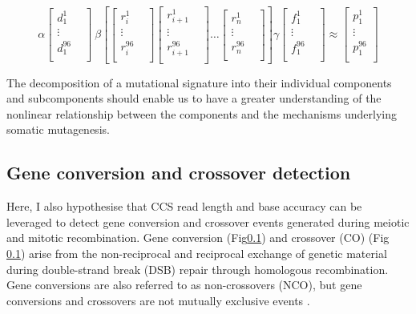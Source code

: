 \begin{equation} \label{eq:4}
\alpha \begin{bmatrix}
    d^{1}_{1}  \\
    \vdots &  \\
    d^{96}_{1}  \\
\end{bmatrix} \
\beta \left[\begin{bmatrix}
    r^{1}_{i} \\
    \vdots &  \\
    r^{96}_{i} \\
\end{bmatrix} 
\begin{bmatrix}
    r^{1}_{i+1} \\
    \vdots &  \\
    r^{96}_{i+1} \\
\end{bmatrix} \ldots 
\begin{bmatrix}
    r^{1}_{n} \\
    \vdots &  \\
    r^{96}_{n} \\
\end{bmatrix}\right]
\gamma \begin{bmatrix}
    f^{1}_{1}  \\
    \vdots &  \\
    f^{96}_{1}  \\
\end{bmatrix} \approx
\begin{bmatrix}
    p^{1}_{1} \\
    \vdots \\
    p^{96}_{1} \\
\end{bmatrix}
\end{equation}

The decomposition of a mutational signature into their individual components and subcomponents should enable us to have a greater understanding of the nonlinear relationship between the components and the mechanisms underlying somatic mutagenesis.



\subsection{Gene conversion and crossover detection}

Here, I also hypothesise that CCS read length and base accuracy can be leveraged to detect gene conversion and crossover events generated during meiotic and mitotic recombination. Gene conversion (Fig\ref{}) and crossover (CO) (Fig \ref{}) arise from the non-reciprocal and reciprocal exchange of genetic material during double-strand break (DSB) repair through homologous recombination. Gene conversions are also referred to as non-crossovers (NCO), but gene conversions and crossovers are not mutually exclusive events \cite{}. 


